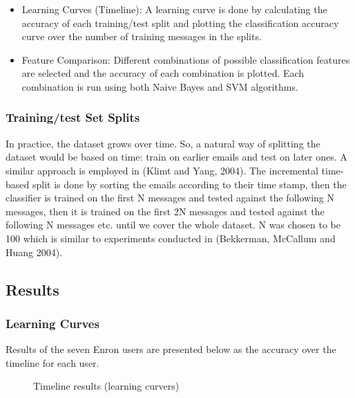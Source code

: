 \begin{itemize}
\item Learning Curves (Timeline): A learning curve is done by calculating the accuracy of each training/test split and plotting the classification accuracy curve over the number of training messages in the splits. 

\item Feature Comparison: Different combinations of possible classification features are selected and the accuracy of each combination is plotted. Each combination is run using both Naive Bayes and SVM algorithms.
\end{itemize}

\subsubsection{Training/test Set Splits}
In practice, the dataset grows over time. So, a natural way of splitting the dataset would be based on time: train on earlier emails and test on later ones. A similar approach is employed in (Klimt and Yang, 2004)\cite{KY04}. 
The incremental time-based split is done by sorting the emails according to their time stamp, then the classifier is trained on the first N messages and tested against the following N messages, then it is trained on the first 2N messages and tested against the following N messages etc. until we cover the whole dataset. N was chosen to be 100 which is similar to experiments conducted in (Bekkerman, McCallum and Huang 2004)\cite{RON04}.

\subsection{Results}

\subsubsection{Learning Curves}
Results of the seven Enron users are presented below as the accuracy over the timeline for each user.

\begin{figure}[H]
    \begin{center}
    \end{center}
    \caption{Timeline results (learning curvers)}
\end{figure}

